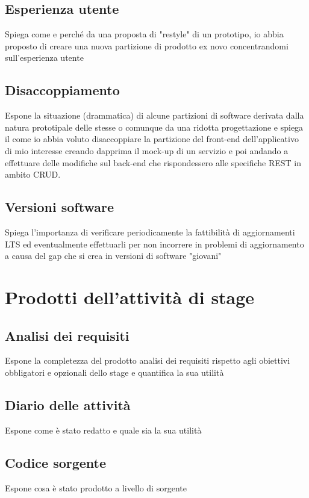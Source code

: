 \subsection{Esperienza utente}
Spiega come e perché da una proposta di "restyle" di un prototipo, io abbia proposto di creare una nuova partizione di prodotto ex novo concentrandomi sull'esperienza utente

\subsection{Disaccoppiamento}
Espone la situazione (drammatica) di alcune partizioni di software derivata dalla natura prototipale delle stesse o comunque da una ridotta progettazione e spiega il come io abbia voluto disaccoppiare la partizione del front-end dell'applicativo di mio interesse creando dapprima il mock-up di un servizio e poi andando a effettuare delle modifiche sul back-end che rispondessero alle specifiche REST in ambito CRUD.

\subsection{Versioni software}
Spiega l'importanza di verificare periodicamente la fattibilità di aggiornamenti LTS ed eventualmente effettuarli per non incorrere in problemi di aggiornamento a causa del gap che si crea in versioni di software "giovani"

\section{Prodotti dell'attività di stage}
\subsection{Analisi dei requisiti}
Espone la completezza del prodotto analisi dei requisiti rispetto agli obiettivi obbligatori e opzionali dello stage e quantifica la sua utilità

\subsection{Diario delle attività}
Espone come è stato redatto e quale sia la sua utilità

\subsection{Codice sorgente}
Espone cosa è stato prodotto a livello di sorgente